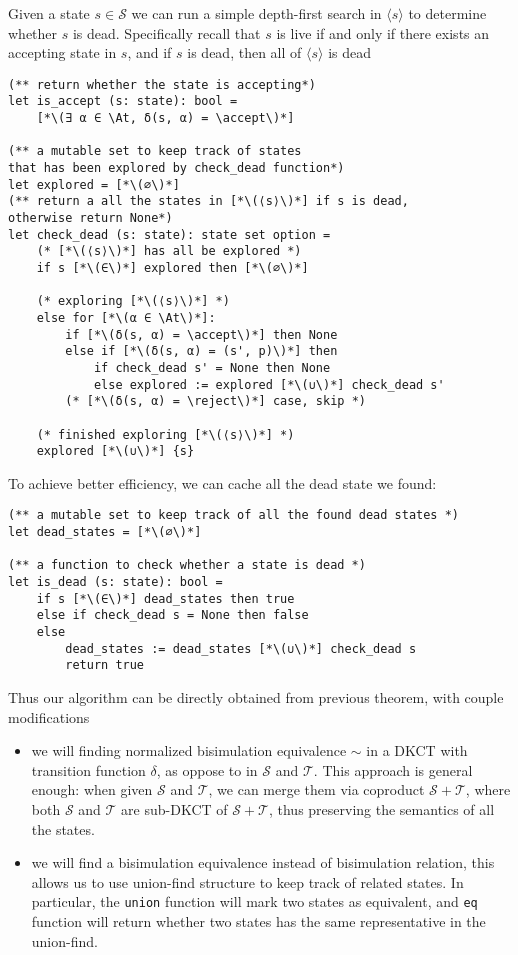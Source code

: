\documentclass[acmsmall,screen]{acmart}
\newcommand{\At}{\mathbf{At}}
\newcommand{\reject}{\mathinner{\mathtt{Reject}}}
\newcommand{\accept}{\mathinner{\mathtt{Accept}}}
\begin{document}
Given a state \(s ∈ 𝒮\) we can run a simple depth-first search in \(⟨s⟩\) to determine whether \(s\) is dead. Specifically recall that \(s\) is live if and only if there exists an accepting state in \(s\), and if \(s\) is dead, then all of \(⟨s⟩\) is dead
\begin{lstlisting}
(** return whether the state is accepting*)
let is_accept (s: state): bool = 
    [*\(∃ α ∈ \At, δ(s, α) = \accept\)*]

(** a mutable set to keep track of states 
that has been explored by check_dead function*)
let explored = [*\(∅\)*]
(** return a all the states in [*\(⟨s⟩\)*] if s is dead, 
otherwise return None*)
let check_dead (s: state): state set option =
    (* [*\(⟨s⟩\)*] has all be explored *)
    if s [*\(∈\)*] explored then [*\(∅\)*]

    (* exploring [*\(⟨s⟩\)*] *)
    else for [*\(α ∈ \At\)*]:
        if [*\(δ(s, α) = \accept\)*] then None 
        else if [*\(δ(s, α) = (s', p)\)*] then 
            if check_dead s' = None then None 
            else explored := explored [*\(∪\)*] check_dead s'
        (* [*\(δ(s, α) = \reject\)*] case, skip *)

    (* finished exploring [*\(⟨s⟩\)*] *)
    explored [*\(∪\)*] {s}
\end{lstlisting}
To achieve better efficiency, we can cache all the dead state we found:
\begin{lstlisting}
(** a mutable set to keep track of all the found dead states *)
let dead_states = [*\(∅\)*]

(** a function to check whether a state is dead *)
let is_dead (s: state): bool =
    if s [*\(∈\)*] dead_states then true 
    else if check_dead s = None then false 
    else 
        dead_states := dead_states [*\(∪\)*] check_dead s
        return true
\end{lstlisting}

Thus our algorithm can be directly obtained from previous theorem, with couple modifications
\begin{itemize}
    \item  we will finding normalized bisimulation equivalence \(∼\) in a DKCT with transition function \(δ\), as oppose to in \(𝒮\) and \(𝒯\). 
    This approach is general enough: when given \(𝒮\) and \(𝒯\), we can merge them via coproduct \(𝒮 + 𝒯\), where both \(𝒮\) and \(𝒯\) are sub-DKCT of \(𝒮 + 𝒯\), thus preserving the semantics of all the states.
    \item we will find a bisimulation equivalence instead of bisimulation relation, this allows us to use union-find structure to keep track of related states. In particular, the \texttt{union} function will mark two states as equivalent, and \texttt{eq} function will return whether two states has the same representative in the union-find.
\end{itemize}  
\end{document}
